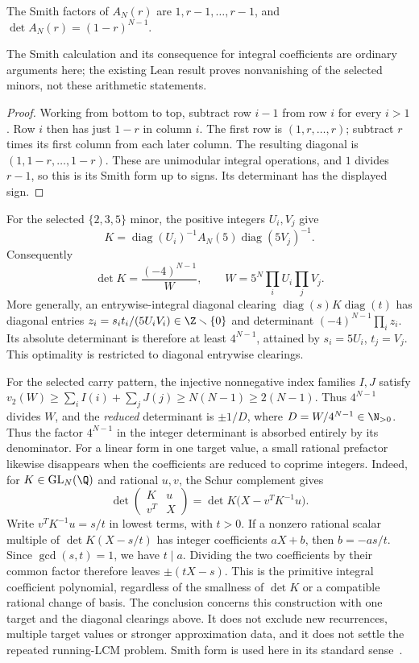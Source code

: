 \begin{remark}
\label{long269:lem:staircase-smith}
The Smith factors of $A_N(r)$ are
$1,r-1,\ldots,r-1$, and
$\det A_N(r)=(1-r)^{N-1}$.
\end{remark}

The Smith calculation and its consequence for integral coefficients are
ordinary arguments here; the existing Lean result proves nonvanishing of
the selected minors, not these arithmetic statements.

\begin{proof}
Working from bottom to top, subtract row $i-1$ from row $i$ for every
$i>1$.  Row $i$ then has just $1-r$ in column $i$.  The first row is
$(1,r,\ldots,r)$; subtract $r$ times its first column from each later
column.  The resulting diagonal is $(1,1-r,\ldots,1-r)$.  These are
unimodular integral operations, and $1$ divides $r-1$, so this is its
Smith form up to signs.  Its determinant has the displayed sign.
\end{proof}

For the selected $\{2,3,5\}$ minor, the positive integers $U_i,V_j$ give
\[
 K=\operatorname{diag}(U_i)^{-1}A_N(5)\operatorname{diag}(5V_j)^{-1}.
\]
Consequently
\[
 \det K=\frac{(-4)^{N-1}}{W},\qquad
 W=5^N\prod_iU_i\prod_jV_j.
\]
More generally, an entrywise-integral diagonal clearing
$\operatorname{diag}(s)K\operatorname{diag}(t)$ has diagonal entries
$z_i=s_it_i/(5U_iV_i)\in\Z\smallsetminus\{0\}$ and determinant
$(-4)^{N-1}\prod_i z_i$.  Its absolute determinant is therefore at
least $4^{N-1}$, attained by $s_i=5U_i$, $t_j=V_j$.
This optimality is restricted to diagonal entrywise clearings.

For the selected carry pattern, the injective nonnegative index families
$I,J$ satisfy
$v_2(W)\ge\sum_iI(i)+\sum_jJ(j)\ge N(N-1)\ge2(N-1)$.
Thus $4^{N-1}$ divides $W$, and the \emph{reduced} determinant is
$\pm1/D$, where $D=W/4^{N-1}\in\N_{>0}$.
Thus the factor $4^{N-1}$ in the integer determinant is absorbed entirely
by its denominator. For a linear form in one target value, a small
rational prefactor likewise disappears when the coefficients are reduced
to coprime integers. Indeed, for $K\in\mathrm{GL}_N(\Q)$ and rational
$u,v$, the Schur complement gives
\[
 \det\begin{pmatrix}K&u\\v^T&X\end{pmatrix}
 =\det K\bigl(X-v^TK^{-1}u\bigr).
\]
Write $v^TK^{-1}u=s/t$ in lowest terms, with $t>0$. If a nonzero
rational scalar multiple of $\det K(X-s/t)$ has integer coefficients
$aX+b$, then $b=-as/t$. Since $\gcd(s,t)=1$, we have $t\mid a$.
Dividing the two coefficients by their common factor therefore leaves
$\pm(tX-s)$. This is the primitive integral coefficient polynomial,
regardless of the smallness of $\det K$ or a compatible rational change
of basis. The conclusion concerns this construction with one target and
the diagonal clearings above. It does not exclude new recurrences,
multiple target values or stronger approximation data, and it does not
settle the repeated running-LCM problem. Smith form is
used here in its standard sense~\cite{stanley2016}.

